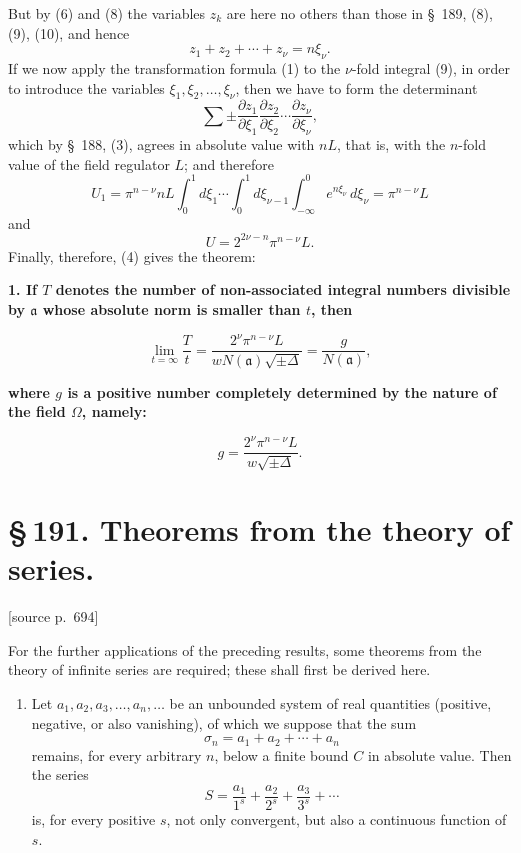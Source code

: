 \documentclass[11pt]{article}
\newcommand{\srcpage}[1]{\par\medskip\noindent\textsf{[source p.~#1]}\par\smallskip}
\begin{document}
But by (6) and (8) the variables $z_k$ are here no others than those in \S~189, (8), (9), (10), and hence
\[
z_1+z_2+\cdots+z_\nu=n\xi_\nu.
\]
If we now apply the transformation formula (1) to the $\nu$-fold integral (9), in order to introduce the variables $\xi_1,\xi_2,\ldots,\xi_\nu$, then we have to form the determinant
\[
\sum\pm
\frac{\partial z_1}{\partial\xi_1}
\frac{\partial z_2}{\partial\xi_2}\cdots
\frac{\partial z_\nu}{\partial\xi_\nu},
\]
which by \S~188, (3), agrees in absolute value with $nL$, that is, with the $n$-fold value of the field regulator $L$; and therefore
\[
U_1=\pi^{n-\nu}nL\int_0^1d\xi_1\cdots\int_0^1d\xi_{\nu-1}\int_{-\infty}^{0}e^{n\xi_\nu}\,d\xi_\nu
=\pi^{n-\nu}L
\]
and
\[
U=2^{2\nu-n}\pi^{n-\nu}L.
\]
Finally, therefore, (4) gives the theorem:

\begin{center}
\textbf{1. If $T$ denotes the number of non-associated integral numbers divisible by $\mathfrak a$ whose absolute norm is smaller than $t$, then}
\end{center}
\begin{equation}
\lim_{t=\infty}\frac{T}{t}
=
\frac{2^\nu\pi^{n-\nu}L}{wN(\mathfrak a)\sqrt{\pm\Delta}}
=
\frac{g}{N(\mathfrak a)},
\tag{10}
\end{equation}
\begin{center}
\textbf{where $g$ is a positive number completely determined by the nature of the field $\Omega$, namely:}
\end{center}
\begin{equation}
g=\frac{2^\nu\pi^{n-\nu}L}{w\sqrt{\pm\Delta}}.
\tag{11}
\end{equation}

\section*{\S\,191. Theorems from the theory of series.}

\srcpage{694}
For the further applications of the preceding results, some theorems from the theory of infinite series are required; these shall first be derived here.

\begin{enumerate}[label=\textbf{\arabic*.},leftmargin=2.2em]
\item Let $a_1,a_2,a_3,\ldots,a_n,\ldots$ be an unbounded system of real quantities (positive, negative, or also vanishing), of which we suppose that the sum
\begin{equation}
\sigma_n=a_1+a_2+\cdots+a_n
\tag{1}
\end{equation}
remains, for every arbitrary $n$, below a finite bound $C$ in absolute value. Then the series
\begin{equation}
S=\frac{a_1}{1^s}+\frac{a_2}{2^s}+\frac{a_3}{3^s}+\cdots
\tag{2}
\end{equation}
is, for every positive $s$, not only convergent, but also a continuous function of $s$.
\end{enumerate}
\end{document}
